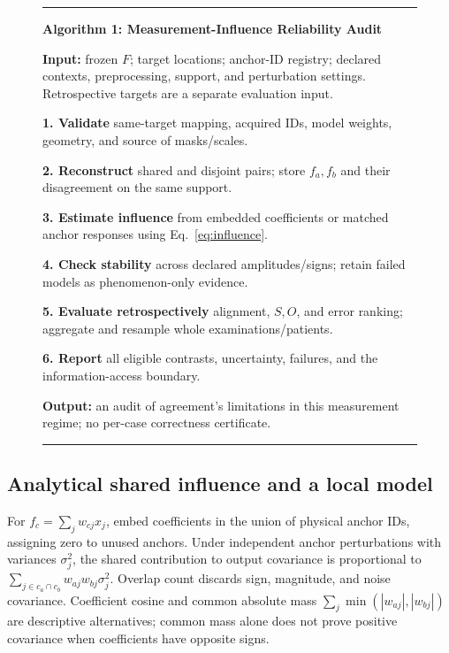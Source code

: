 \documentclass[10pt,twocolumn,letterpaper]{article}
\begin{document}
\begin{figure}[t]
\centering
\begin{minipage}{.97\columnwidth}
\hrule\smallskip
\textbf{Algorithm 1: Measurement-Influence Reliability Audit}\par
\smallskip\small
\textbf{Input:} frozen $F$; target locations; anchor-ID registry; declared contexts, preprocessing, support, and perturbation settings. Retrospective targets are a separate evaluation input.\par
\textbf{1. Validate} same-target mapping, acquired IDs, model weights, geometry, and source of masks/scales.\par
\textbf{2. Reconstruct} shared and disjoint pairs; store $f_a,f_b$ and their disagreement on the same support.\par
\textbf{3. Estimate influence} from embedded coefficients or matched anchor responses using Eq.~\ref{eq:influence}.\par
\textbf{4. Check stability} across declared amplitudes/signs; retain failed models as phenomenon-only evidence.\par
\textbf{5. Evaluate retrospectively} alignment, $S,O$, and error ranking; aggregate and resample whole examinations/patients.\par
\textbf{6. Report} all eligible contrasts, uncertainty, failures, and the information-access boundary.\par
\textbf{Output:} an audit of agreement's limitations in this measurement regime; no per-case correctness certificate.\par
\smallskip\hrule
\end{minipage}
\end{figure}

\subsection{Analytical shared influence and a local model}
For $f_c=\sum_j w_{cj}x_j$, embed coefficients in the union of physical anchor IDs, assigning zero to unused anchors. Under independent anchor perturbations with variances $\sigma_j^2$, the shared contribution to output covariance is proportional to $\sum_{j\in c_a\cap c_b}w_{aj}w_{bj}\sigma_j^2$. Overlap count discards sign, magnitude, and noise covariance. Coefficient cosine and common absolute mass $\sum_j\min(|w_{aj}|,|w_{bj}|)$ are descriptive alternatives; common mass alone does not prove positive covariance when coefficients have opposite signs.
\end{document}
